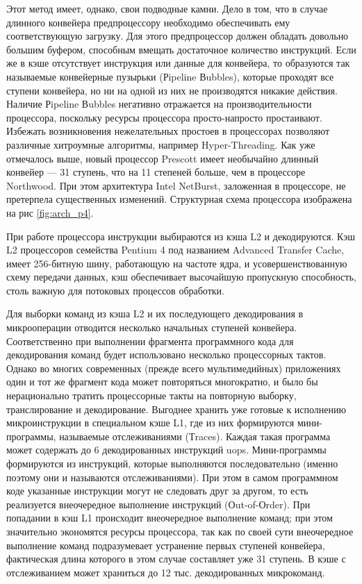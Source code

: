 \documentclass[12pt, a4paper, utf8]{article}
\begin{document}
Этот метод имеет, однако, свои подводные камни. Дело в том, что в случае длинного конвейера предпроцессору необходимо обеспечивать ему соответствующую загрузку. Для этого предпроцессор должен обладать довольно большим буфером, способным вмещать достаточное количество инструкций. Если же в кэше отсутствует инструкция или данные для конвейера, то образуются так называемые конвейерные пузырьки (Рipeline Вubbles), которые проходят все ступени конвейера, но ни на одной из них не производятся никакие действия. Наличие Рipeline Вubbles негативно отражается на производительности процессора, поскольку ресурсы процессора просто-напросто простаивают. Избежать возникновения нежелательных простоев в процессорах позволяют различные хитроумные алгоритмы, например Hyper-Threading.
Как уже отмечалось выше, новый процессор Prescott имеет необычайно длинный конвейер — 31 ступень, что на 11 степеней больше, чем в процессоре Northwood. При этом архитектура Intel NetBurst, заложенная в процессоре, не претерпела существенных изменений. Структурная схема процессора изображена на рис \ref{fig:arch_p4}.


При работе процессора инструкции выбираются из кэша L2 и декодируются. Кэш L2 процессоров семейства Pentium 4 под названием Advanced Transfer Cache, имеет 256-битную шину, работающую на частоте ядра, и усовершенствованную схему передачи данных, кэш обеспечивает высочайшую пропускную способность, столь важную для потоковых процессов обработки.

Для выборки команд из кэша L2 и их последующего декодирования в микрооперации отводится несколько начальных ступеней конвейера. Соответственно при выполнении фрагмента программного кода для декодирования команд будет использовано несколько процессорных тактов. Однако во многих современных (прежде всего мультимедийных) приложениях один и тот же фрагмент кода может повторяться многократно, и было бы нерационально тратить процессорные такты на повторную выборку, транслирование и декодирование. Выгоднее хранить уже готовые к исполнению микроинструкции в специальном кэше L1, где из них формируются мини-программы, называемые отслеживаниями (Тraces). Каждая такая программа может содержать до 6 декодированных инструкций uops. Мини-программы формируются из инструкций, которые выполняются последовательно (именно поэтому они и называются отслеживаниями). При этом в самом программном коде указанные инструкции могут не следовать друг за другом, то есть реализуется внеочередное выполнение инструкций (Оut-of-Оrder). При попадании в кэш L1 происходит внеочередное выполнение команд; при этом значительно экономятся ресурсы процессора, так как по своей сути внеочередное выполнение команд подразумевает устранение первых ступеней конвейера, фактическая длина которого в этом случае составляет уже 31 ступень. В кэше с отслеживанием может храниться до 12 тыс. декодированных микрокоманд.
\end{document}
